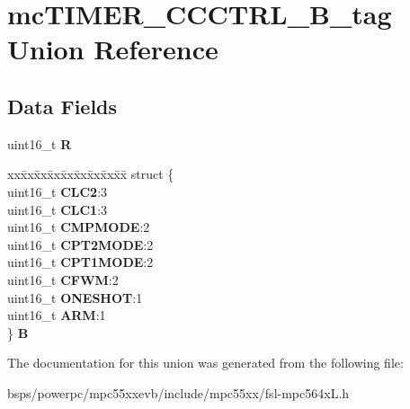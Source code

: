\hypertarget{unionmcTIMER__CCCTRL__16B__tag}{}\section{mc\+T\+I\+M\+E\+R\+\_\+\+C\+C\+C\+T\+R\+L\+\_\+B\+\_\+tag Union Reference}
\label{unionmcTIMER__CCCTRL__16B__tag}
\subsection*{Data Fields}
\begin{DoxyCompactItemize}
\item 
\mbox{\label{unionmcTIMER__CCCTRL__16B__tag_a4d88e83792627048bf3aa65c98e32617}} 
uint16\+\_\+t {\bfseries R}
\item 
\mbox{\label{unionmcTIMER__CCCTRL__16B__tag_a62d9eb9b3840895df6f97b9cdfc8f256}} 
\begin{tabbing}
xx\=xx\=xx\=xx\=xx\=xx\=xx\=xx\=xx\=\kill
struct \{\\
\>uint16\_t {\bfseries CLC2}:3\\
\>uint16\_t {\bfseries CLC1}:3\\
\>uint16\_t {\bfseries CMPMODE}:2\\
\>uint16\_t {\bfseries CPT2MODE}:2\\
\>uint16\_t {\bfseries CPT1MODE}:2\\
\>uint16\_t {\bfseries CFWM}:2\\
\>uint16\_t {\bfseries ONESHOT}:1\\
\>uint16\_t {\bfseries ARM}:1\\
\} {\bfseries B}\\

\end{tabbing}\end{DoxyCompactItemize}


The documentation for this union was generated from the following file\+:\begin{DoxyCompactItemize}
\item 
bsps/powerpc/mpc55xxevb/include/mpc55xx/fsl-\/mpc564x\+L.\+h\end{DoxyCompactItemize}

